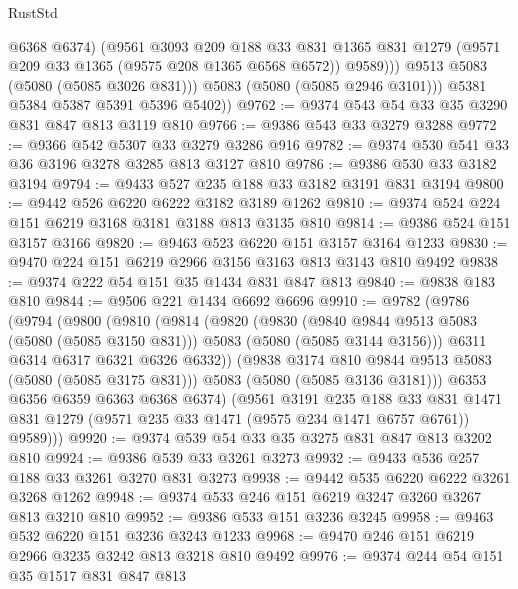 \begin{lexlean}{RustStd}
\begin{coremodule}
{\begin{coremodule}
{{{{{                  @6368
                  @6374)
                (@9561
                  @3093
                  @209
                  @188
                  @33
                  @831
                  @1365
                  @831
                  @1279
                  (@9571 @209 @33 @1365 (@9575 @208 @1365 @6568 @6572))
                  @9589)))
            @9513
            @5083
            (@5080 (@5085 @3026 @831)))
          @5083
          (@5080 (@5085 @2946 @3101)))
        @5381
        @5384
        @5387
        @5391
        @5396
        @5402))
@9762 := @9374 @543 @54 @33 @35 @3290 @831 @847 @813 @3119 @810
@9766 := @9386 @543 @33 @3279 @3288
@9772 := @9366 @542 @5307 @33 @3279 @3286 @916
@9782 := @9374 @530 @541 @33 @36 @3196 @3278 @3285 @813 @3127 @810
@9786 := @9386 @530 @33 @3182 @3194
@9794 := @9433 @527 @235 @188 @33 @3182 @3191 @831 @3194
@9800 := @9442 @526 @6220 @6222 @3182 @3189 @1262
@9810 := @9374 @524 @224 @151 @6219 @3168 @3181 @3188 @813 @3135 @810
@9814 := @9386 @524 @151 @3157 @3166
@9820 := @9463 @523 @6220 @151 @3157 @3164 @1233
@9830 := @9470 @224 @151 @6219 @2966 @3156 @3163 @813 @3143 @810 @9492
@9838 := @9374 @222 @54 @151 @35 @1434 @831 @847 @813
@9840 := @9838 @183 @810
@9844 := @9506 @221 @1434 @6692 @6696
@9910 := @9782
    (@9786
      (@9794
        (@9800
          (@9810
            (@9814
              (@9820
                (@9830
                  (@9840 @9844 @9513 @5083 (@5080 (@5085 @3150 @831)))
                  @5083
                  (@5080 (@5085 @3144 @3156)))
                @6311
                @6314
                @6317
                @6321
                @6326
                @6332))
            (@9838 @3174 @810 @9844 @9513 @5083 (@5080 (@5085 @3175 @831)))
            @5083
            (@5080 (@5085 @3136 @3181)))
          @6353
          @6356
          @6359
          @6363
          @6368
          @6374)
        (@9561
          @3191
          @235
          @188
          @33
          @831
          @1471
          @831
          @1279
          (@9571 @235 @33 @1471 (@9575 @234 @1471 @6757 @6761))
          @9589)))
@9920 := @9374 @539 @54 @33 @35 @3275 @831 @847 @813 @3202 @810
@9924 := @9386 @539 @33 @3261 @3273
@9932 := @9433 @536 @257 @188 @33 @3261 @3270 @831 @3273
@9938 := @9442 @535 @6220 @6222 @3261 @3268 @1262
@9948 := @9374 @533 @246 @151 @6219 @3247 @3260 @3267 @813 @3210 @810
@9952 := @9386 @533 @151 @3236 @3245
@9958 := @9463 @532 @6220 @151 @3236 @3243 @1233
@9968 := @9470 @246 @151 @6219 @2966 @3235 @3242 @813 @3218 @810 @9492
@9976 := @9374 @244 @54 @151 @35 @1517 @831 @847 @813
}}}}}
\end{coremodule}}
\end{coremodule}
\end{lexlean}

